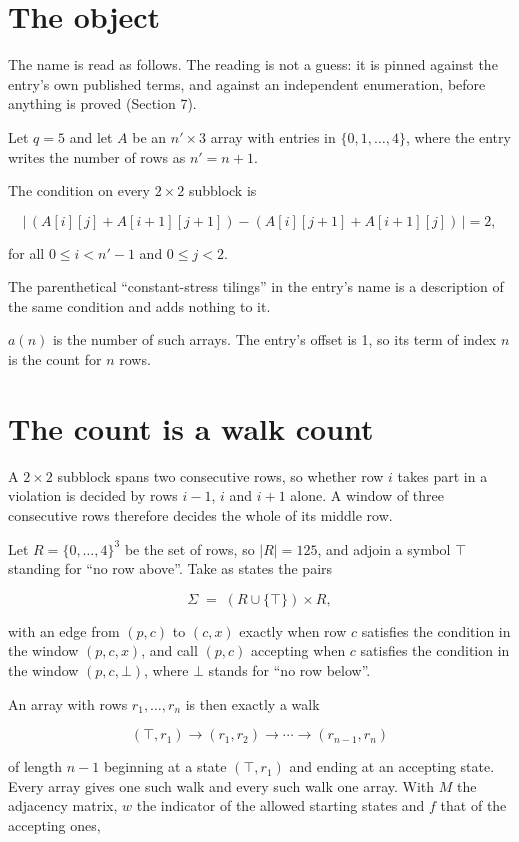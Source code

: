 \documentclass[11pt]{article}
\theoremstyle{definition}
\begin{document}
\section{The object}

The name is read as follows. The reading is not a guess: it is pinned against the entry's own published terms, and against an independent enumeration, before anything is proved (Section 7).

Let $q = 5$ and let $A$ be an $n' \times 3$ array with entries in $\{0,1,\dots,4\}$, where the entry writes the number of rows as $n' = n + 1$.

The condition on every $2 \times 2$ subblock is

\[\bigl|\,(A[i][j] + A[i{+}1][j{+}1]) - (A[i][j{+}1] + A[i{+}1][j])\,\bigr| = 2,\]

for all $0 \le i < n'-1$ and $0 \le j < 2$.

The parenthetical ``constant-stress tilings'' in the entry's name is a description of the same condition and adds nothing to it.

$a(n)$ is the number of such arrays. The entry's offset is 1, so its term of index $n$ is the count for $n$ rows.

\section{The count is a walk count}

A $2 \times 2$ subblock spans two consecutive rows, so whether row $i$ takes part in a violation is decided by rows $i-1$, $i$ and $i+1$ alone. A window of three consecutive rows therefore decides the whole of its middle row.

Let $R = \{0,\dots,4\}^{3}$ be the set of rows, so $|R| = 125$, and adjoin a symbol $\top$ standing for ``no row above''. Take as states the pairs

\[\Sigma \;=\; (R \cup \{\top\}) \times R,\]

with an edge from $(p,c)$ to $(c,x)$ exactly when row $c$ satisfies the condition in the window $(p,c,x)$, and call $(p,c)$ accepting when $c$ satisfies the condition in the window $(p,c,\bot)$, where $\bot$ stands for ``no row below''.

An array with rows $r_1,\dots,r_n$ is then exactly a walk

\[(\top,r_1) \to (r_1,r_2) \to \cdots \to (r_{n-1},r_n)\]

of length $n-1$ beginning at a state $(\top,r_1)$ and ending at an accepting state. Every array gives one such walk and every such walk one array. With $M$ the adjacency matrix, $w$ the indicator of the allowed starting states and $f$ that of the accepting ones,
\end{document}
